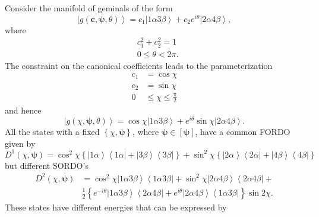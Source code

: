 \documentclass[aps,preprint]{revtex4}%
\begin{document}
Consider the manifold of geminals of the form
\begin{equation}
\left\vert g\left(  \boldsymbol{c},\boldsymbol{\psi},\theta\right)
\right\rangle =c_{1}\left\vert 1\alpha3\beta\right\rangle +c_{2}e^{i\theta
}\left\vert 2\alpha4\beta\right\rangle ,
\end{equation}
where
\begin{align}
&  c_{1}^{2}+c_{2}^{2}=1\nonumber\\
&  0\leq\theta<2\pi.
\end{align}
The constraint on the canonical coefficients leads to the parameterization
\begin{align}
c_{1}  &  =\cos\chi\nonumber\\
c_{2}  &  =\sin\chi\nonumber\\
0  &  \leq\chi\leq\frac{\pi}{2}%
\end{align}
and hence%
\begin{equation}
\left\vert g\left(  \chi,\boldsymbol{\psi},\theta\right)  \right\rangle
=\cos\chi\left\vert 1\alpha3\beta\right\rangle +e^{i\theta}\sin\chi\left\vert
2\alpha4\beta\right\rangle .
\end{equation}
All the states with a fixed $\left\{  \chi,\boldsymbol{\psi}\right\}  $, where
$\boldsymbol{\psi\in}\left[  \boldsymbol{\psi}\right]  $, have a common FORDO
given by%
\[
D^{1}\left(  \chi,\boldsymbol{\psi}\right)  =\cos^{2}\chi\left\{  \left\vert
1\alpha\right\rangle \left\langle 1\alpha\right\vert +\left\vert
3\beta\right\rangle \left\langle 3\beta\right\vert \right\}  +\sin^{2}%
\chi\left\{  \left\vert 2\alpha\right\rangle \left\langle 2\alpha\right\vert
+\left\vert 4\beta\right\rangle \left\langle 4\beta\right\vert \right\}
\]
but different SORDO's%
\begin{align}
D^{2}\left(  \chi,\boldsymbol{\psi}\right)   &  =\cos^{2}\chi\left\vert
1\alpha3\beta\right\rangle \left\langle 1\alpha3\beta\right\vert +\sin^{2}%
\chi\left\vert 2\alpha4\beta\right\rangle \left\langle 2\alpha4\beta
\right\vert +\nonumber\\
&  \frac{1}{2}\left\{  e^{-i\theta}\left\vert 1\alpha3\beta\right\rangle
\left\langle 2\alpha4\beta\right\vert +e^{i\theta}\left\vert 2\alpha
4\beta\right\rangle \left\langle 1\alpha3\beta\right\vert \right\}  \sin2\chi.
\end{align}
These states have different energies that can be expressed by%
\end{document}
